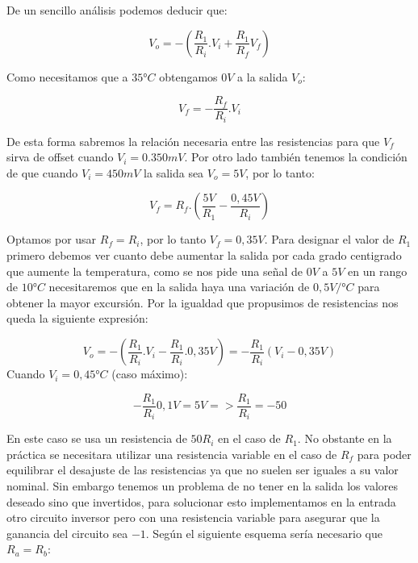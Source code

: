 De un sencillo análisis podemos deducir que:

\begin{equation}
    V_o = -(\frac{R_1}{R_i}.V_i + \frac{R_1}{R_f} V_f)
\end{equation}

Como necesitamos que a $35°C$ obtengamos $0V$ a la salida $V_o$:

\begin{equation}
    V_f = -\frac{R_f}{R_i} .V_i
\end{equation}

De esta forma sabremos la relación necesaria entre las resistencias para que $V_f$ sirva de offset cuando $V_i=0.350mV$. Por otro lado también tenemos la condición de que cuando $V_i=450mV$ la salida sea $V_o = 5V$, por lo tanto:

\begin{equation}
    V_f = R_f . (\frac{5V}{R_1} - \frac{0,45V}{R_i})
\end{equation}

Optamos por usar $R_f = R_i$, por lo tanto $V_f=0,35V$. Para designar el valor de $R_1$ primero debemos ver cuanto debe aumentar la salida por cada grado centigrado que aumente la temperatura, como se nos pide una señal de $0V$ a $5V$ en un rango de $10°C$ necesitaremos que en la salida haya una variación de $0,5V/°C$ para obtener la mayor excursión. Por la igualdad que propusimos de resistencias nos queda la siguiente expresión:

\begin{equation}
    V_o = -( \frac{R_1}{R_i} . V_i - \frac{R_1}{R_i}.0,35V ) = -\frac{R_1}{R_i} (V_i-0,35V)
\end{equation}
Cuando $V_i = 0,45°C$ (caso máximo):

\begin{equation}
    -\frac{R_1}{R_i} 0,1V = 5V => \frac{R_1}{R_i}=-50
\end{equation}

En este caso se usa un resistencia de $50R_i$ en el caso de $R_1$. No obstante en la práctica se necesitara utilizar una resistencia variable en el caso de $R_f$ para poder equilibrar el desajuste de las resistencias ya que no suelen ser iguales a su valor nominal.
Sin embargo tenemos un problema de no tener en la salida los valores deseado sino que invertidos, para solucionar esto implementamos en la entrada otro circuito inversor pero con una resistencia variable para asegurar que la ganancia del circuito sea $-1$. Según el siguiente esquema sería necesario que $R_a = R_b$:

